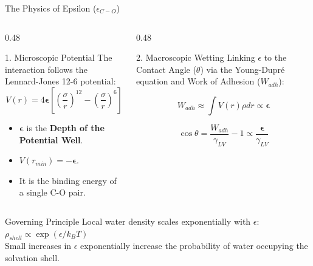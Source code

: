 \documentclass[aspectratio=169, 10pt]{beamer}
\begin{document}
\begin{frame}{The Physics of Epsilon ($\epsilon_{C-O}$)}

    \begin{columns}[T]
        \begin{column}{0.48\textwidth}
            \begin{block}{1. Microscopic Potential}
                The interaction follows the Lennard-Jones 12-6 potential:
                $$ V(r) = 4\bm{\epsilon} \left[ \left(\frac{\sigma}{r}\right)^{12} - \left(\frac{\sigma}{r}\right)^{6} \right] $$
                \begin{itemize}
                    \item $\bm{\epsilon}$ is the \textbf{Depth of the Potential Well}.
                    \item $V(r_{min}) = -\bm{\epsilon}$.
                    \item It is the binding energy of a single C-O pair.
                \end{itemize}
            \end{block}
        \end{column}

        \begin{column}{0.48\textwidth}
            \begin{block}{2. Macroscopic Wetting}
                Linking $\epsilon$ to the Contact Angle ($\theta$) via the Young-Dupré equation and Work of Adhesion ($W_{adh}$):
                
                $$ W_{adh} \approx \int V(r) \rho dr \propto \bm{\epsilon} $$
                
                $$ \cos \theta = \frac{W_{adh}}{\gamma_{LV}} - 1 \propto \frac{\bm{\epsilon}}{\gamma_{LV}} $$
            \end{block}
        \end{column}
    \end{columns}

    \vspace{0.5cm}
    
    \begin{alertblock}{Governing Principle}
        \centering
        Local water density scales exponentially with $\epsilon$: \quad $\rho_{shell} \propto \exp(\epsilon / k_B T)$ \\
        \small Small increases in $\epsilon$ exponentially increase the probability of water occupying the solvation shell.
    \end{alertblock}

\end{frame}
\end{document}
